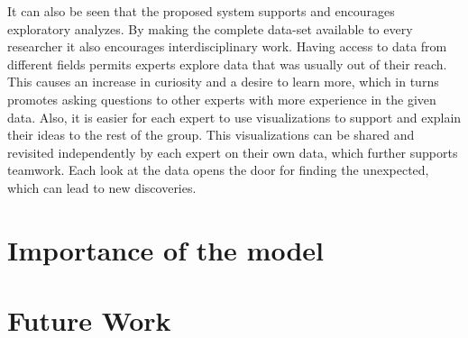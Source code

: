 It can also be seen that the proposed system supports and encourages exploratory analyzes. By making the complete data-set available to every researcher it also encourages interdisciplinary work. Having access to data from different fields permits experts explore data that was usually out of their reach. This causes an increase in curiosity and a desire to learn more, which in turns promotes asking questions to other experts with more experience in the given data. Also, it is easier for each expert to use visualizations to support and explain their ideas to the rest of the group. This visualizations can be shared and revisited independently by each expert on their own data, which further supports teamwork. Each look at the data opens the door for finding the unexpected, which can lead to new discoveries. 


\section{Importance of the model}






\section{Future Work}





